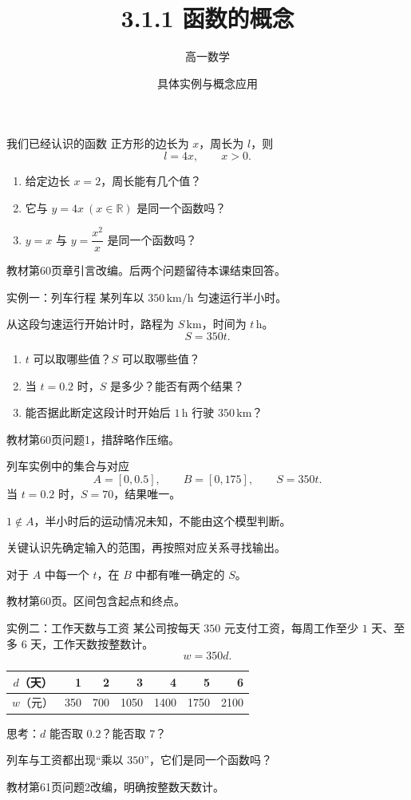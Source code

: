 \documentclass[aspectratio=169,10pt]{beamer}
\title{3.1.1 函数的概念}
\author{高一数学}
\date{具体实例与概念应用}
\newcommand{\R}{\mathbb R}
\newcommand{\src}[1]{\par\vfill{\tiny\color{gray}#1}}
\newcommand{\key}[1]{\begin{block}{关键认识}#1\end{block}}
\begin{document}
\campusmaketitle
\begin{frame}[t]{我们已经认识的函数}
正方形的边长为 $x$，周长为 $l$，则
\[l=4x,\qquad x>0.\]
\bigskip
\begin{enumerate}
\item 给定边长 $x=2$，周长能有几个值？
\item 它与 $y=4x\ (x\in\R)$ 是同一个函数吗？
\item $y=x$ 与 $y=\dfrac{x^2}{x}$ 是同一个函数吗？
\end{enumerate}
\src{教材第60页章引言改编。后两个问题留待本课结束回答。}
\end{frame}
\begin{frame}[t]{实例一：列车行程}
某列车以 $350\,\mathrm{km/h}$ 匀速运行半小时。\par
从这段匀速运行开始计时，路程为 $S\,\mathrm{km}$，时间为 $t\,\mathrm h$。
\[S=350t.\]
\begin{enumerate}
\item $t$ 可以取哪些值？$S$ 可以取哪些值？
\item 当 $t=0.2$ 时，$S$ 是多少？能否有两个结果？
\item 能否据此断定这段计时开始后 $1\,\mathrm h$ 行驶 $350\,\mathrm{km}$？
\end{enumerate}
\src{教材第60页问题1，措辞略作压缩。}
\end{frame}
\begin{frame}[t]{列车实例中的集合与对应}
\[A=[0,0.5],\qquad B=[0,175],\qquad S=350t.\]
\bigskip
当 $t=0.2$ 时，$S=70$，结果唯一。\par\medskip
$1\notin A$，半小时后的运动情况未知，不能由这个模型判断。
\key{先确定输入的范围，再按照对应关系寻找输出。\par
对于 $A$ 中每一个 $t$，在 $B$ 中都有唯一确定的 $S$。}
\src{教材第60页。区间包含起点和终点。}
\end{frame}
\begin{frame}[t]{实例二：工作天数与工资}
某公司按每天 $350$ 元支付工资，每周工作至少 $1$ 天、至多 $6$ 天，工作天数按整数计。
\[w=350d.\]
\begin{center}
\begin{tabular}{c|rrrrrr}
$d$（天）&1&2&3&4&5&6\\\hline
$w$（元）&350&700&1050&1400&1750&2100
\end{tabular}
\end{center}
\medskip
思考：$d$ 能否取 $0.2$？能否取 $7$？\par\medskip
列车与工资都出现“乘以 $350$”，它们是同一个函数吗？
\src{教材第61页问题2改编，明确按整数天数计。}
\end{frame}
\end{document}
